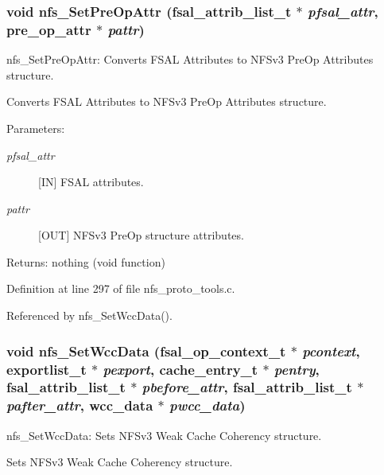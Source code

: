 \subsubsection{\setlength{\rightskip}{0pt plus 5cm}void nfs\_\-Set\-Pre\-Op\-Attr (fsal\_\-attrib\_\-list\_\-t $\ast$ {\em pfsal\_\-attr}, pre\_\-op\_\-attr $\ast$ {\em pattr})}\label{nfs__proto__tools_8c_a3}


nfs\_\-Set\-Pre\-Op\-Attr: Converts FSAL Attributes to NFSv3 Pre\-Op Attributes structure.

Converts FSAL Attributes to NFSv3 Pre\-Op Attributes structure.

\begin{Desc}
\item[Parameters:]
\begin{description}
\item[{\em pfsal\_\-attr}][IN] FSAL attributes. \item[{\em pattr}][OUT] NFSv3 Pre\-Op structure attributes.\end{description}
\end{Desc}
\begin{Desc}
\item[Returns:]nothing (void function) \end{Desc}


Definition at line 297 of file nfs\_\-proto\_\-tools.c.

Referenced by nfs\_\-Set\-Wcc\-Data().
\subsubsection{\setlength{\rightskip}{0pt plus 5cm}void nfs\_\-Set\-Wcc\-Data (fsal\_\-op\_\-context\_\-t $\ast$ {\em pcontext}, exportlist\_\-t $\ast$ {\em pexport}, cache\_\-entry\_\-t $\ast$ {\em pentry}, fsal\_\-attrib\_\-list\_\-t $\ast$ {\em pbefore\_\-attr}, fsal\_\-attrib\_\-list\_\-t $\ast$ {\em pafter\_\-attr}, wcc\_\-data $\ast$ {\em pwcc\_\-data})}\label{nfs__proto__tools_8c_a4}


nfs\_\-Set\-Wcc\-Data: Sets NFSv3 Weak Cache Coherency structure.

Sets NFSv3 Weak Cache Coherency structure.

